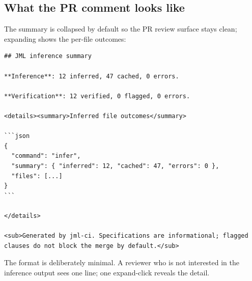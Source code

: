 \subsection{What the PR comment looks like}

The summary is collapsed by default so the PR review surface stays clean; expanding shows the per-file outcomes:

\begin{lstlisting}[language={}]
## JML inference summary

**Inference**: 12 inferred, 47 cached, 0 errors.

**Verification**: 12 verified, 0 flagged, 0 errors.

<details><summary>Inferred file outcomes</summary>

```json
{
  "command": "infer",
  "summary": { "inferred": 12, "cached": 47, "errors": 0 },
  "files": [...]
}
```

</details>

<sub>Generated by jml-ci. Specifications are informational; flagged
clauses do not block the merge by default.</sub>
\end{lstlisting}

The format is deliberately minimal. A reviewer who is not interested in the inference output sees one line; one expand-click reveals the detail.
